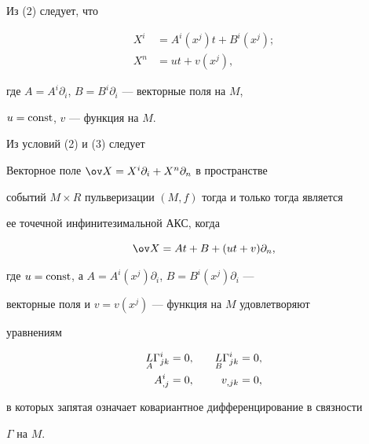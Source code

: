 Из (2) следует, что 


\begin{equation} 


\begin{split} 


X^i&=A^i(x^j)t+B^i(x^j);\\[2mm] 


X^n&=u t+v(x^j), 


\end{split} 


\end{equation} 


где $A=A^i\partial_i$, $B=B^i\partial_i$ --- векторные поля на $M$, 


$u=\operatorname{const}$, $v$ --- функция на $M$. 


 


Из условий (2) и (3) следует 


 


\begin{thm} 


Векторное поле $\ov X=X^i\partial_i+X^n\partial_n$ в пространстве 


событий $M\times R$ пульверизации $(M,f)$ тогда и только тогда является 


ее точечной инфинитезимальной АКС, когда 


$$ 


\ov X=A t+B+(u t+v)\partial_n, 


$$ 


где $u=\operatorname{const}$, а $A=A^i(x^j)\partial_i$, $B=B^i(x^j)\partial_i$ --- 


векторные поля и $v=v(x^j)$ --- функция на $M$ удовлетворяют 


уравнениям


\begin{alignat*}{2} 


\down{A}{L}\Gamma^i_{j k}&=0, &\quad 


\down{B}{L}\Gamma^i_{j k}&=0,\\ 


A^i_{,j}&=0, &\quad v_{, j k}&=0, 


\end{alignat*} 


в которых запятая означает ковариантное дифференцирование в связности 


$\Gamma$ на $M$. 


\end{thm} 


